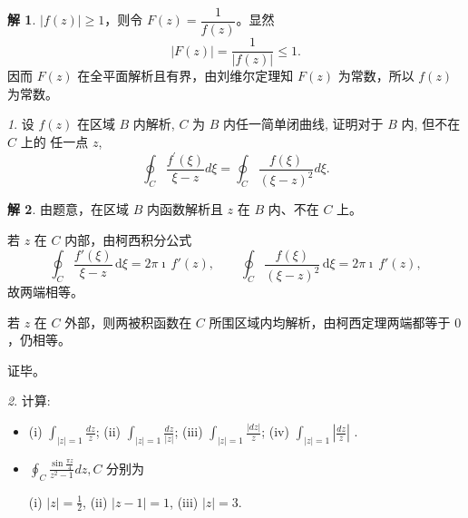 \documentclass[11pt]{article}
\theoremstyle{remark}
\newtheorem{problem}{}
\theoremstyle{definition}
\newtheorem{solution}{解}
\begin{document}
\begin{solution}
$|f(z)|\geq 1$，则令 $F(z)=\dfrac{1}{f(z)}$。显然
\[
|F(z)|=\frac{1}{|f(z)|}\leq 1.
\]
因而 $F(z)$ 在全平面解析且有界，由刘维尔定理知 $F(z)$ 为常数，所以 $f(z)$ 为常数。
\end{solution}

\begin{problem}
设 $f(z)$ 在区域 $B$ 内解析, $C$ 为 $B$ 内任一简单闭曲线, 证明对于 $B$ 内,
但不在 $C$ 上的 任一点 $z$,
\[
\oint_C \frac{f^{\prime}(\xi)}{\xi-z} d \xi=\oint_C \frac{f(\xi)}{(\xi-z)^2} d \xi.
\]
\end{problem}

\begin{solution}
由题意，在区域 $B$ 内函数解析且 $z$ 在 $B$ 内、不在 $C$ 上。

若 $z$ 在 $C$ 内部，由柯西积分公式
\[
\oint_{C}\frac{f'(\xi)}{\xi-z}\,\mathrm{d}\xi=2\pi\imath\, f'(z),\qquad
\oint_{C}\frac{f(\xi)}{(\xi-z)^{2}}\,\mathrm{d}\xi=2\pi\imath\, f'(z),
\]
故两端相等。

若 $z$ 在 $C$ 外部，则两被积函数在 $C$ 所围区域内均解析，由柯西定理两端都等于 $0$，仍相等。

证毕。
\end{solution}

\begin{problem}
计算:
\begin{itemize}
  \item
  (i) $\int_{|z|=1} \frac{d z}{z}$;
  (ii) $\int_{|z|=1} \frac{d z}{|z|}$;
  (iii) $\int_{|z|=1} \frac{|d z|}{z}$;
  (iv) $\int_{|z|=1}\left|\frac{d z}{z}\right|$ .

  \item  $\oint_C \frac{\sin \frac{\pi z}{4}}{z^2-1} d z, C$ 分别为

  (i) $|z|=\frac{1}{2}$,
  (ii) $|z-1|=1$,
  (iii) $|z|=3$.

\end{itemize}
\end{problem}
\end{document}

